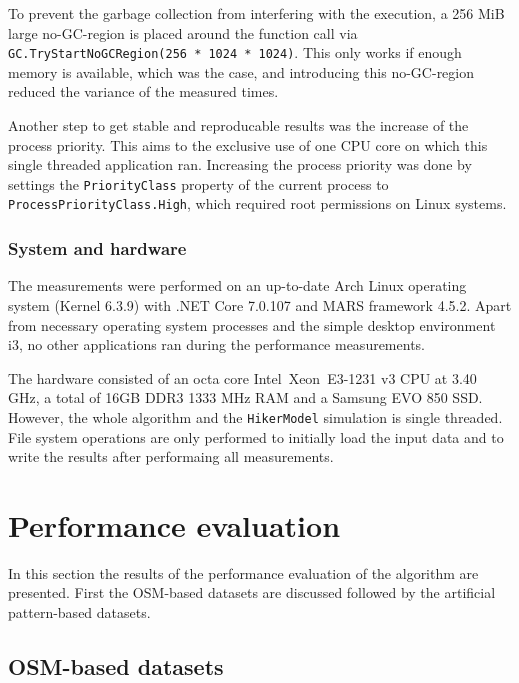 			To prevent the garbage collection from interfering with the execution, a 256 MiB large no-GC-region is placed around the function call via \texttt{GC.TryStartNoGCRegion(256 * 1024 * 1024)}.
			This only works if enough memory is available\cite{ms-no-gc-region}, which was the case, and introducing this no-GC-region reduced the variance of the measured times.
			
			Another step to get stable and reproducable results was the increase of the process priority.
			This aims to the exclusive use of one CPU core on which this single threaded application ran.
			Increasing the process priority was done by settings the \texttt{PriorityClass} property of the current process to \texttt{ProcessPriorityClass.High}, which required root permissions on Linux systems.
		
		\subsubsection{System and hardware}
		
			The measurements were performed on an up-to-date Arch Linux operating system (Kernel 6.3.9) with .NET Core 7.0.107 and MARS framework 4.5.2.
			Apart from necessary operating system processes and the simple desktop environment i3, no other applications ran during the performance measurements.
			
			The hardware consisted of an octa core Intel\textregistered\ Xeon\textregistered\ E3-1231 v3 CPU at 3.40 GHz, a total of 16GB DDR3 1333 MHz RAM and a Samsung EVO 850 SSD.
			However, the whole algorithm and the \texttt{HikerModel} simulation is single threaded.
			File system operations are only performed to initially load the input data and to write the results after performaing all measurements.
	
\section{Performance evaluation}

	In this section the results of the performance evaluation of the algorithm are presented.
	First the OSM-based datasets are discussed followed by the artificial pattern-based datasets.

	\subsection{OSM-based datasets}
		
